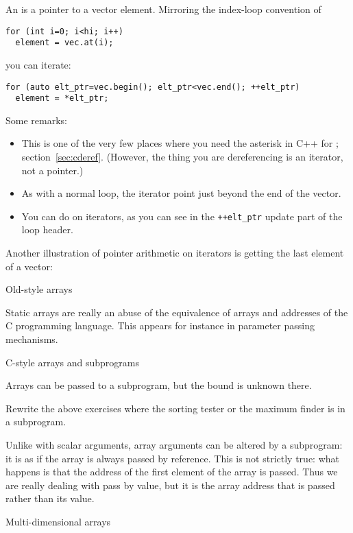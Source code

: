 An  is a pointer to a vector element. Mirroring
the index-loop convention of
\begin{lstlisting}
for (int i=0; i<hi; i++)
  element = vec.at(i);
\end{lstlisting}
you can iterate:
\begin{lstlisting}
for (auto elt_ptr=vec.begin(); elt_ptr<vec.end(); ++elt_ptr)
  element = *elt_ptr;
\end{lstlisting}
Some remarks:
\begin{itemize}
\item This is one of the very few places where you need the asterisk in C++
  for ; section~\ref{sec:cderef}. (However,
  the thing you are dereferencing is an iterator, not a pointer.)
\item As with a normal loop, the  iterator point just beyond the end
  of the vector.
\item You can do  on iterators, as
  you can see in the \verb-++elt_ptr- update part of the loop header.
\end{itemize}
Another illustration of pointer arithmetic on iterators is getting the
last element of a vector:
%

 {Old-style arrays}

Static arrays are really an abuse of the equivalence of arrays and
addresses of the C programming language. This appears for instance in
parameter passing mechanisms.

 {C-style arrays and subprograms}

Arrays can be passed to a subprogram, but the bound is unknown there.
%
%
\begin{exercise}
  Rewrite the above exercises where the sorting tester or the maximum
  finder is in a subprogram.
\end{exercise}

Unlike with scalar arguments, array arguments can be altered by a
subprogram: it is as if the array is always passed by reference. This is
not strictly true: what happens is that the address of the first
element of the array is passed. Thus we are really dealing with pass
by value, but it is the array address that is passed rather than its value.

 {Multi-dimensional arrays}

